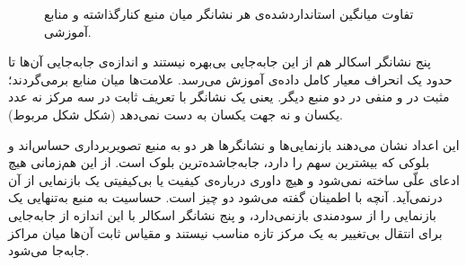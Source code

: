 \begin{figure}[htbp]
  \centering
  \caption{تفاوت میانگین استانداردشده‌ی هر نشانگر میان منبع کنارگذاشته و منابع آموزشی.}
  \label{fig:U27}
\end{figure}




پنج نشانگر اسکالر هم از این جابه‌جایی بی‌بهره نیستند و اندازه‌ی جابه‌جایی آن‌ها تا حدود یک انحراف معیار کامل داده‌ی آموزش می‌رسد. علامت‌ها میان منابع برمی‌گردند؛ مثبت در  و منفی در دو منبع دیگر. یعنی یک نشانگر با تعریف ثابت در سه مرکز نه عدد یکسان و نه جهت یکسان به دست نمی‌دهد (شکل شکل مربوط).



این اعداد نشان می‌دهند بازنمایی‌ها و نشانگرها هر دو به منبع تصویربرداری حساس‌اند و بلوکی که بیشترین سهم را دارد، جابه‌جاشده‌ترین بلوک است. از این هم‌زمانی هیچ ادعای علّی ساخته نمی‌شود و هیچ داوری درباره‌ی کیفیت یا بی‌کیفیتی یک بازنمایی از آن درنمی‌آید. آنچه با اطمینان گفته می‌شود دو چیز است. حساسیت به منبع به‌تنهایی یک بازنمایی را از سودمندی بازنمی‌دارد، و پنج نشانگر اسکالر با این اندازه از جابه‌جایی برای انتقال بی‌تغییر به یک مرکز تازه مناسب نیستند و مقیاس ثابت آن‌ها میان مراکز جابه‌جا می‌شود.
